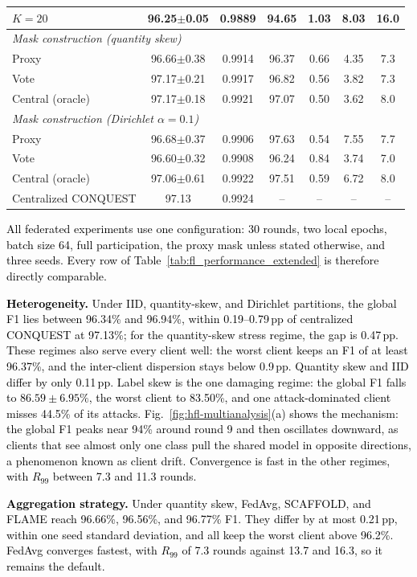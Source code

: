 \documentclass[conference]{IEEEtran}
\begin{document}
\begin{table}[!t]
\begin{tabular}{lcccccc}
$K{=}20$ & 96.25$\pm$0.05 & 0.9889 & 94.65 & 1.03 & 8.03 & 16.0 \\
\midrule
\multicolumn{7}{l}{\textit{Mask construction (quantity skew)}} \\
Proxy & 96.66$\pm$0.38 & 0.9914 & 96.37 & 0.66 & 4.35 & 7.3 \\
Vote & 97.17$\pm$0.21 & 0.9917 & 96.82 & 0.56 & 3.82 & 7.3 \\
Central (oracle) & 97.17$\pm$0.18 & 0.9921 & 97.07 & 0.50 & 3.62 & 8.0 \\
\midrule
\multicolumn{7}{l}{\textit{Mask construction (Dirichlet $\alpha{=}0.1$)}} \\
Proxy & 96.68$\pm$0.37 & 0.9906 & 97.63 & 0.54 & 7.55 & 7.7 \\
Vote & 96.60$\pm$0.32 & 0.9908 & 96.24 & 0.84 & 3.74 & 7.0 \\
Central (oracle) & 97.06$\pm$0.61 & 0.9922 & 97.51 & 0.59 & 6.72 & 8.0 \\
\midrule
Centralized CONQUEST & 97.13 & 0.9924 & -- & -- & -- & -- \\
\hline\toprule
\end{tabular}
\end{table}

\textcolor{black}{All federated experiments
use one configuration: 30 rounds, two local epochs, batch size 64,
full participation, the proxy mask unless stated otherwise, and three
seeds. Every row of Table~\ref{tab:fl_performance_extended} is
therefore directly comparable.}

\textcolor{black}{\textbf{Heterogeneity.} Under IID,
quantity-skew, and Dirichlet partitions, the global F1 lies between
96.34\% and 96.94\%, within 0.19--0.79\,pp of centralized CONQUEST at
97.13\%; for the quantity-skew stress regime, the gap is 0.47\,pp.
These regimes also serve every client well: the worst client keeps an
F1 of at least 96.37\%, and the inter-client dispersion stays below
0.9\,pp. Quantity skew and IID differ by only 0.11\,pp. Label skew is the one
damaging regime: the global F1 falls to $86.59\pm6.95\%$, the worst
client to 83.50\%, and one attack-dominated client misses 44.5\% of
its attacks. Fig.~\ref{fig:hfl-multianalysis}(a) shows the mechanism:
the global F1 peaks near 94\% around round 9 and then oscillates
downward, as clients that see almost only one class pull the shared
model in opposite directions, a phenomenon known as client drift.
Convergence is fast in the other regimes, with $R_{99}$ between 7.3
and 11.3 rounds.}

\textcolor{black}{\textbf{Aggregation
strategy.} Under quantity skew, FedAvg, SCAFFOLD, and FLAME reach
96.66\%, 96.56\%, and 96.77\% F1. They differ by at most 0.21\,pp,
within one seed standard deviation, and all keep the worst client
above 96.2\%. FedAvg converges fastest, with $R_{99}$ of 7.3 rounds
against 13.7 and 16.3, so it remains the default.}
\end{document}
